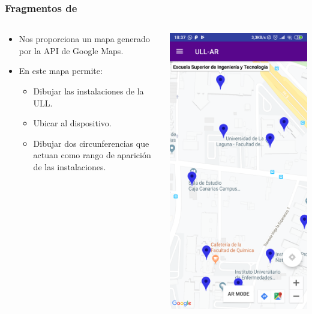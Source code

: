 \begin{frame}
	\frametitle{Fragmentos de \ULLAR{}}
	\begin{columns}
		\begin{column}{0.6\textwidth}
			\begin{itemize}
				\item Nos proporciona un mapa generado por la API de Google Maps.
				\item En este mapa permite:
				\begin{itemize}
					\item Dibujar las instalaciones de la ULL.
					\item Ubicar al dispositivo.
					\item Dibujar dos circunferencias que actuan como rango de aparición de las instalaciones. 
				\end{itemize}
			\end{itemize}
			\endblock{}
		\end{column}
		\begin{column}{0.4\textwidth} 
			\vfill 
			\begin{center}
				\includegraphics[width=0.7\linewidth]{Images/mapsApp}
			\end{center}
		\end{column}
	\end{columns}
\end{frame}


